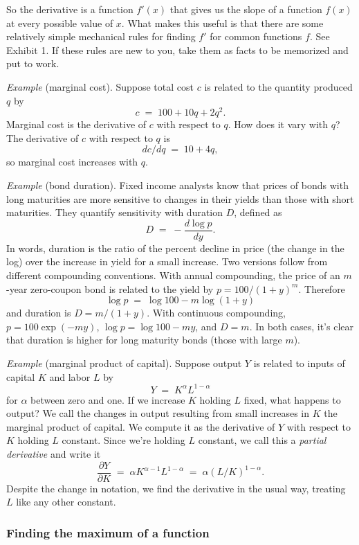 \documentclass[letterpaper,12pt]{article}
\begin{document}
So the derivative is a function $f'(x)$ that gives us the slope of a function $f(x)$ at every possible value of $x$.
What makes this useful is that there are some
relatively simple mechanical rules for finding $f'$
for common functions $f$.
See Exhibit 1.
If these rules are new to you,
take them as facts to be memorized and put to work.


{\it Example} (marginal cost).
Suppose total cost $c$ is related to the quantity produced $q$ by
\[
    c \;=\; 100 + 10 q + 2 q^2 .
\]
Marginal cost is the derivative of $c$ with respect to $q$.
How does it vary with $q$?
The derivative of $c$ with respect to $q$ is
\[
    dc/dq \;=\; 10 + 4 q ,
\]
so marginal cost increases with $q$.


{\it Example} (bond duration).
Fixed income analysts know that prices of bonds with long maturities
are more sensitive to changes in their yields than those with short maturities.
They quantify sensitivity with duration $D$, defined as
\[
    D \;=\; - \frac{d \log p}{dy} .
\]
In words, duration is the ratio of the percent decline in price (the change in the log)
over the increase in yield for a small increase.
Two versions follow from different compounding conventions.
With annual compounding, the price of an $m$-year zero-coupon bond
is related to the yield by $ p = 100/(1+y)^m$.
Therefore
\[
    \log p \;=\; \log 100 - m \log (1+y)
\]
and duration is $ D = m/(1+y)$.
With continuous compounding, $ p = 100 \exp(-my)$,
$ \log p = \log 100 - m y$,
and $D = m$.
In both cases, it's clear that duration is higher for long maturity bonds
(those with large $m$).


{\it Example\/} (marginal product of capital).
Suppose output $Y$ is related to inputs of capital $K$ and labor $L$ by
\[
    Y \;=\; K^\alpha L^{1-\alpha}
\]
for $\alpha$ between zero and one.
If we increase $K$ holding $L$ fixed, what happens to output?
We call the changes in output resulting from small increases in $K$
the marginal product of capital.
We compute it as the derivative of $Y$ with respect to $K$ holding $L$ constant.
Since we're holding $L$ constant, we call this a {\it partial derivative\/} and write it
\[
    \frac{\partial Y}{\partial K} \;=\; \alpha K^{\alpha-1} L^{1-\alpha} \;=\; \alpha (L/K)^{1-\alpha}.
\]
Despite the change in notation, we find the derivative in the usual way,
treating $L$ like any other constant.


\subsubsection*{Finding the maximum of a function}
\end{document}
